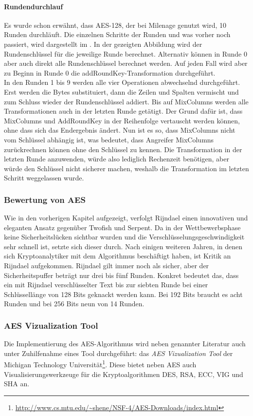   \paragraph{Rundendurchlauf}
  Es wurde schon erwähnt, dass AES-128, der bei Milenage genutzt wird, 10 Runden durchläuft. Die einzelnen Schritte
  der Runden und was vorher noch passiert, wird dargestellt im . In der gezeigten Abbildung
  wird der Rundenschlüssel für die jeweilige Runde berechnet. Alternativ können in Runde 0 aber auch direkt alle
  Rundenschlüssel berechnet werden. Auf jeden Fall wird aber zu Beginn in Runde 0 die addRoundKey-Transformation
  durchgeführt. \\
  In den Runden 1 bis 9 werden alle vier Operationen abwechselnd durchgeführt. Erst werden die Bytes substituiert, dann
  die Zeilen und Spalten vermischt und zum Schluss wieder der Rundenschlüssel addiert. Bis auf MixColumns werden
  alle Transformationen auch in der letzten Runde getätigt. Der Grund dafür ist, dass MixColumns und AddRoundKey in
  der Reihenfolge vertauscht werden können, ohne dass sich das Endergebnis ändert. Nun ist es so, dass MixColumns
  nicht vom Schlüssel abhängig ist, was bedeutet, dass Angreifer MixColumns zurückrechnen können ohne den Schlüssel
  zu kennen. Die Transformation in der letzten Runde anzuwenden, würde also lediglich Rechenzeit benötigen, aber würde
  den Schlüssel nicht sicherer machen, weshalb die Transformation im letzten Schritt weggelassen wurde. \cite{schmeh07}
  
  \subsubsection[Bewertung von AES (Heumann)]{Bewertung von AES}
  Wie in den vorherigen Kapitel aufgezeigt, verfolgt Rijndael einen innovativen und eleganten Ansatz gegenüber Twofish und
  Serpent. Da in der Wettbewerbsphase keine Sicherheitslücken sichtbar wurden und die Verschlüsselungsgeschwindigkeit
  sehr schnell ist, setzte sich dieser durch. Nach einigen weiteren Jahren, in denen sich Kryptoanalytiker mit dem Algorithmus
  beschäftigt haben, ist Kritik an Rijndael aufgekommen. Rijndael gilt immer noch als sicher, aber der Sicherheitspuffer beträgt
  nur drei bis fünf Runden. Konkret bedeutet das, dass ein mit Rijndael verschlüsselter Text bis zur siebten Runde bei einer
  Schlüssellänge von 128 Bits geknackt werden kann. Bei 192 Bits braucht es acht Runden und bei 256 Bits neun von 14 Runden.
  
   \subsubsection[AES Vizualization Tool (Schenkel)]{AES Vizualization Tool}
   \label{subsubsec:aesviz}
   Die Implementierung des AES-Algorithmus wird neben genannter Literatur auch unter
   Zuhilfenahme eines Tool durchgeführt: das \textit{AES Vizualization Tool} der Michigan
   Technology Universität\footnote{\url{http://www.cs.mtu.edu/~shene/NSF-4/AES-Downloads/index.html}}.
   Diese bietet neben AES auch Visualisierungswerkzeuge für die Kryptoalgorithmen DES, RSA, ECC, VIG
   und SHA an.

